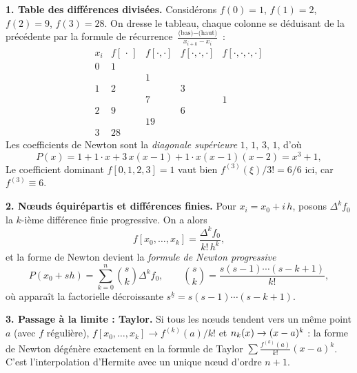 \begin{mdframed}[style=exbar]
  \textbf{1. Table des différences divisées.}\enspace
  Considérons $f(0)=1$, $f(1)=2$, $f(2)=9$, $f(3)=28$. On dresse le tableau,
  chaque colonne se déduisant de la précédente par la formule de récurrence
  $\tfrac{\text{(bas)}-\text{(haut)}}{x_{i+k}-x_i}$ :
  \[
    \begin{array}{c|cccc}
      x_i & f[\,\cdot\,] & f[\cdot,\cdot] & f[\cdot,\cdot,\cdot]
          & f[\cdot,\cdot,\cdot,\cdot]\\ \hline
      0 & 1  &    &    & \\
        &    & 1  &    & \\
      1 & 2  &    & 3  & \\
        &    & 7  &    & 1\\
      2 & 9  &    & 6  & \\
        &    & 19 &    & \\
      3 & 28 &    &    &
    \end{array}
  \]
  Les coefficients de Newton sont la \emph{diagonale supérieure}
  $1,\,1,\,3,\,1$, d'où
  \[
    P(x) = 1 + 1\cdot x + 3\,x(x-1) + 1\cdot x(x-1)(x-2) = x^3+1,
  \]
  Le coefficient dominant $f[0,1,2,3]=1$ vaut bien
  $f^{(3)}(\xi)/3!=6/6$ ici, car $f^{(3)}\equiv 6$.

  \smallskip\noindent
  \textbf{2. Nœuds équirépartis et différences finies.}\enspace
  Pour $x_i = x_0 + i\,h$, posons $\Delta^k f_0$ la $k$-ième différence
  finie progressive. On a alors
  \[
    f[x_0,\ldots,x_k] = \dfrac{\Delta^k f_0}{k!\,h^k},
  \]
  et la forme de Newton devient la \emph{formule de Newton progressive}
  \[
    P(x_0+sh) = \sum_{k=0}^{n} \binom{s}{k}\Delta^k f_0,
    \qquad \binom{s}{k}=\frac{s(s-1)\cdots(s-k+1)}{k!},
  \]
  où apparaît la factorielle décroissante $s^{\underline{k}}=s(s-1)\cdots(s-k+1)$.

  \smallskip\noindent
  \textbf{3. Passage à la limite : Taylor.}\enspace
  Si tous les nœuds tendent vers un même point $a$ (avec $f$ régulière),
  $f[x_0,\ldots,x_k]\to f^{(k)}(a)/k!$ et $n_{k}(x)\to(x-a)^k$ : la
  forme de Newton dégénère exactement en la formule de Taylor
  $\sum \tfrac{f^{(k)}(a)}{k!}(x-a)^k$. C'est l'interpolation d'Hermite
  avec un unique nœud d'ordre $n+1$.
\end{mdframed}

\vspace{6pt}

